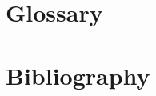 \documentclass[ENG]{TFUOC}%
\begin{document}
\chapter{Glossary}

\chapter{Bibliography}
\begingroup
\renewcommand{\chapter}[2]{}%
\end{document}
